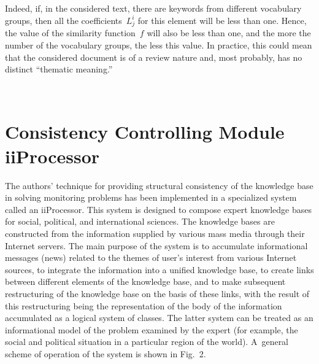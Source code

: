 \begin{multicols}{2}
     Indeed, if, in the considered text, there are keywords from different 
vocabulary groups, then all the coefficients~$L^i_j$ for this element will be less 
than one. Hence, the value of the similarity function~$f$ will also be less than one, 
and the more the number of the vocabulary groups, the less this value. In practice, 
this could mean that the considered document is of a review nature and, most 
probably, has no distinct ``thematic meaning.''

\begin{figure*} %
\vspace*{1pt}
    \begin{center}  
  \mbox{%
 \epsfxsize=156.872mm 
 }
\end{center}
\vspace*{-10pt}
\end{figure*}
     
\section{Consistency Controlling Module iiProcessor}

     \noindent
     The authors' technique for providing structural consistency of the knowledge 
base in solving monitoring problems has been implemented in a specialized system 
called an iiProcessor. This system is designed to compose expert knowledge bases 
for social, political, and international sciences. The knowledge bases are 
constructed from the information supplied by various mass media through their 
Internet servers. The main purpose of the system is to accumulate informational 
messages (news) related to the themes of user's interest from various Internet 
sources, to integrate the information into a unified knowledge base, to create links 
between different elements of the knowledge base, and to make subsequent 
restructuring of the knowledge base on the basis of these links, with the result of 
this restructuring being the representation of the body of the information 
accumulated as a logical system of classes. The latter system can be treated as an 
informational model of the problem examined by the expert (for example, the 
social and political situation in a particular region of the world). A~general scheme 
of operation of the system is shown in Fig.~2.




\end{multicols}
